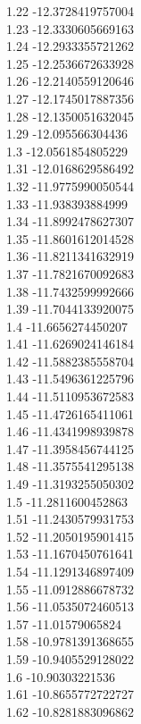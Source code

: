 {1.22	-12.3728419757004\\
1.23	-12.3330605669163\\
1.24	-12.2933355721262\\
1.25	-12.2536672633928\\
1.26	-12.2140559120646\\
1.27	-12.1745017887356\\
1.28	-12.1350051632045\\
1.29	-12.095566304436\\
1.3	-12.0561854805229\\
1.31	-12.0168629586492\\
1.32	-11.9775990050544\\
1.33	-11.938393884999\\
1.34	-11.8992478627307\\
1.35	-11.8601612014528\\
1.36	-11.8211341632919\\
1.37	-11.7821670092683\\
1.38	-11.7432599992666\\
1.39	-11.7044133920075\\
1.4	-11.6656274450207\\
1.41	-11.6269024146184\\
1.42	-11.5882385558704\\
1.43	-11.5496361225796\\
1.44	-11.5110953672583\\
1.45	-11.4726165411061\\
1.46	-11.4341998939878\\
1.47	-11.3958456744125\\
1.48	-11.3575541295138\\
1.49	-11.3193255050302\\
1.5	-11.2811600452863\\
1.51	-11.2430579931753\\
1.52	-11.2050195901415\\
1.53	-11.1670450761641\\
1.54	-11.1291346897409\\
1.55	-11.0912886678732\\
1.56	-11.0535072460513\\
1.57	-11.01579065824\\
1.58	-10.9781391368655\\
1.59	-10.9405529128022\\
1.6	-10.90303221536\\
1.61	-10.8655772722727\\
1.62	-10.8281883096862\\
}

